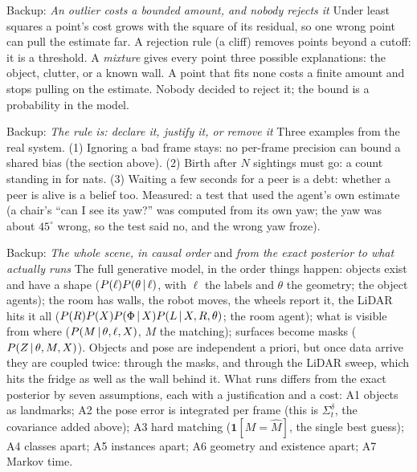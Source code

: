 \documentclass[11pt]{article}
\begin{document}
\begin{backupbox}{Backup: \emph{An outlier costs a bounded amount, and nobody rejects it}}
Under least squares a point's cost grows with the square of its residual, so one wrong point can pull the estimate far. A rejection rule (a cliff) removes points beyond a cutoff: it is a threshold. A \emph{mixture} gives every point three possible explanations: the object, clutter, or a known wall. A point that fits none costs a finite amount and stops pulling on the estimate. Nobody decided to reject it; the bound is a probability in the model.
\end{backupbox}

\begin{backupbox}{Backup: \emph{The rule is: declare it, justify it, or remove it}}
Three examples from the real system. (1) Ignoring a bad frame stays: no per-frame precision can bound a shared bias (the section above). (2) Birth after $N$ sightings must go: a count standing in for nats. (3) Waiting a few seconds for a peer is a debt: whether a peer is alive is a belief too. Measured: a test that used the agent's own estimate (a chair's ``can I see its yaw?'' was computed from its own yaw; the yaw was about $45^\circ$ wrong, so the test said no, and the wrong yaw froze).
\end{backupbox}

\begin{backupbox}{Backup: \emph{The whole scene, in causal order} and \emph{from the exact posterior to what actually runs}}
The full generative model, in the order things happen: objects exist and have a shape ($P(\ell)P(\theta\,|\,\ell)$, with $\ell$ the labels and $\theta$ the geometry; the object agents); the room has walls, the robot moves, the wheels report it, the LiDAR hits it all ($P(R)P(X)P(\Phi\,|\, X)P(L\,|\, X,R,\theta)$; the room agent); what is visible from where ($P(M\,|\,\theta,\ell,X)$, $M$ the matching); surfaces become masks ($P(Z\,|\,\theta,M,X)$). Objects and pose are independent a priori, but once data arrive they are coupled twice: through the masks, and through the LiDAR sweep, which hits the fridge as well as the wall behind it. What runs differs from the exact posterior by seven assumptions, each with a justification and a cost: A1 objects as landmarks; A2 the pose error is integrated per frame (this is $\Sigma_t^\delta$, the covariance added above); A3 hard matching ($\mathbf 1[M=\hat M]$, the single best guess); A4 classes apart; A5 instances apart; A6 geometry and existence apart; A7 Markov time.
\end{backupbox}
\end{document}
